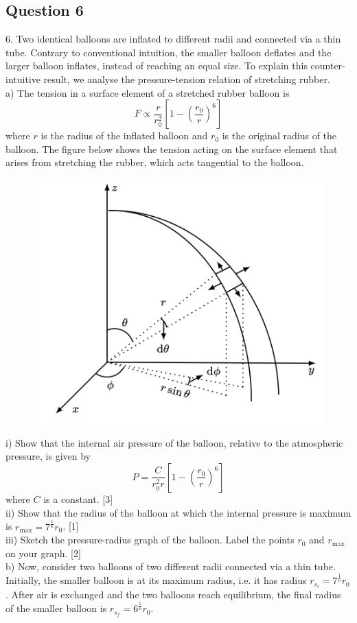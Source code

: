 \documentclass{article}
\begin{document}
\subsection{Question 6}
6. Two identical balloons are inflated to different radii and connected via a thin tube. Contrary to conventional intuition, the smaller balloon deflates and the larger balloon inflates, instead of reaching an equal size. To explain this counter-intuitive result, we analyse the pressure-tension relation of stretching rubber. \\
a) The tension in a surface element of a stretched rubber balloon is
$$
F \propto \frac{r}{r_{0}^{2}}\left[1-\left(\frac{r_{0}}{r}\right)^{6}\right]
$$
where $r$ is the radius of the inflated balloon and $r_{0}$ is the original radius of the balloon. The figure below shows the tension acting on the surface element that arises from stretching the rubber, which acts tangential to the balloon.
\begin{figure}
	\centering
	\includegraphics[width=0.5\linewidth]{spho_book_TYS_images/2017q6.png}
	\caption{}
\end{figure}
i) Show that the internal air pressure of the balloon, relative to the atmospheric pressure, is given by
$$
P=\frac{C}{r_{0}^{2} r}\left[1-\left(\frac{r_{0}}{r}\right)^{6}\right]
$$
where $C$ is a constant. [3] \\
ii) Show that the radius of the balloon at which the internal pressure is maximum is $r_{\max }=7^{\frac{1}{6}} r_{0}$. [1] \\
iii) Sketch the pressure-radius graph of the balloon. Label the points $r_{0}$ and $r_{\max }$ on your graph. [2] \\
b) Now, consider two balloons of two different radii connected via a thin tube. Initially, the smaller balloon is at its maximum radius, i.e. it has radius $r_{s_{i}}=7^{\frac{1}{6}} r_{0}$. After air is exchanged and the two balloons reach equilibrium, the final radius of the smaller balloon is $r_{s_{f}}=6^{\frac{1}{6}} r_{0}$. \\
\end{document}
